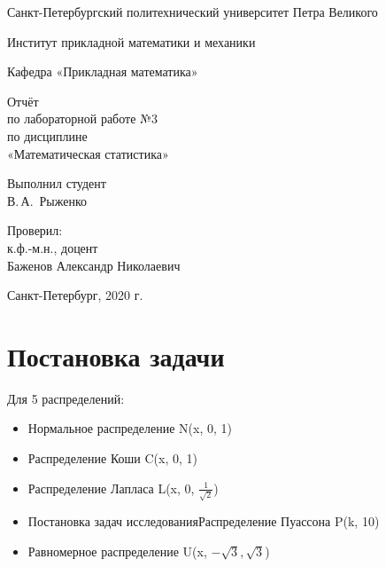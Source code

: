 \documentclass[12pt,a4paper]{scrartcl}
\begin{document}
\begin{titlepage}
  \begin{center}

    Санкт-Петербургский политехнический университет Петра Великого

    \vspace{0.25cm}
    
    Институт прикладной математики и механики
    
    Кафедра «Прикладная математика»
    \vfill

	\vspace{0.25cm}
	    Отчёт\\
	по лабораторной работе №3\\
	по дисциплине\\
	«Математическая статистика»

  \bigskip

\end{center}
\vfill

\newlength{\ML}
\hfill\begin{minipage}{0.4\textwidth}
  Выполнил студент\\ В.\,А.~Рыженко\\
\end{minipage}%
\bigskip

\hfill\begin{minipage}{0.4\textwidth}
  Проверил:\\
к.ф.-м.н., доцент\\
Баженов Александр Николаевич\\
\end{minipage}%
\vfill

\begin{center}
  Санкт-Петербург, 2020 г.
\end{center}
\end{titlepage}

\tableofcontents
\listoffigures
\listoftables
\newpage

\section{Постановка задачи}
 
Для 5 распределений:
\begin{itemize}
 \item Нормальное распределение N(x, 0, 1)
 \item Распределение Коши C(x, 0, 1)
 \item Распределение Лапласа L(x, 0, $\frac{1}{\sqrt2}$)
 \item Постановка задач исследованияРаспределение Пуассона P(k, 10)
 \item Равномерное распределение U(x, $-\sqrt{3}, \sqrt{3}$) 
\end{itemize}
 
\end{document}
